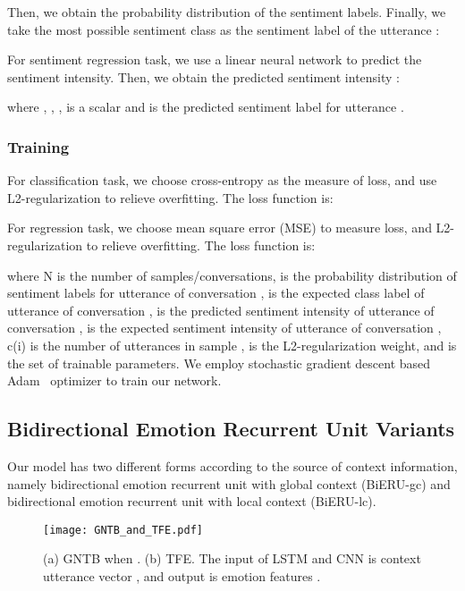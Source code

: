 \documentclass[journal]{IEEEtran}
\begin{document}
Then, we obtain the probability distribution  of the sentiment labels. Finally, we take the most possible sentiment class as the sentiment label of the utterance :


For sentiment regression task, we use a linear neural network  to predict the sentiment intensity. Then, we obtain the predicted sentiment intensity :

where , , ,  is a scalar and  is the predicted sentiment label for utterance .



\subsubsection{Training}
For classification task, we choose cross-entropy as the measure of loss, and use L2-regularization to relieve overfitting. The loss function is:


For regression task, we choose mean square error (MSE) to measure loss, and L2-regularization to relieve overfitting. The loss function is:

where N is the number of samples/conversations,  is the probability distribution of sentiment labels for utterance  of conversation ,  is the expected class label of utterance  of conversation ,  is the predicted sentiment intensity of utterance  of conversation ,  is the expected sentiment intensity of utterance  of conversation , c(i) is the number of utterances in sample ,  is the L2-regularization weight, and  is the set of trainable parameters. We employ stochastic gradient descent based Adam~\cite{kingma2014adam} optimizer to train our network.


\subsection{Bidirectional Emotion Recurrent Unit Variants}
Our model has two different forms according to the source of context information, namely bidirectional emotion recurrent unit with global context (BiERU-gc) and bidirectional emotion recurrent unit with local context (BiERU-lc).

\begin{figure}[!ht]
\centering\texttt{[image: GNTB\_and\_TFE.pdf]}
\caption{(a) GNTB when . (b) TFE. The input of LSTM and CNN is context utterance vector , and output is emotion features .}
\label{fig:ntb_and_tfe}
\end{figure}
\end{document}
